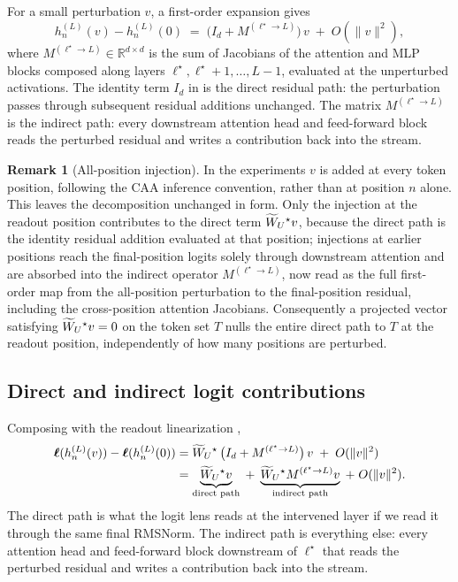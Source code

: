 \documentclass[11pt,letterpaper]{article}
\theoremstyle{plain}
\theoremstyle{definition}
\newtheorem{remark}[theorem]{Remark}
\newcommand{\R}{\mathbb{R}}
\newcommand{\1}{\mathbf{1}}
\newcommand{\WUt}{\widetilde{W}_{U}\mathchoice{}{}{}{}}
\newcommand{\hres}{h}
\begin{document}
For a small perturbation $v$, a first-order expansion gives
\begin{equation}
\hres^{(L)}_n(v) - \hres^{(L)}_n(0) \;=\; \big(I_d + M^{(\ell^\star \to L)}\big)\, v \;+\; O(\|v\|^2),
\label{eq:propagation}
\end{equation}
where $M^{(\ell^\star \to L)} \in \R^{d \times d}$ is the sum of Jacobians of the attention and MLP blocks composed along layers $\ell^\star, \ell^\star+1, \dots, L-1$, evaluated at the unperturbed activations. The identity term $I_d$ in  is the direct residual path: the perturbation passes through subsequent residual additions unchanged. The matrix $M^{(\ell^\star \to L)}$ is the indirect path: every downstream attention head and feed-forward block reads the perturbed residual and writes a contribution back into the stream.

\begin{remark}[All-position injection]
In the experiments $v$ is added at every token position, following the CAA inference convention, rather than at position $n$ alone. This leaves the decomposition  unchanged in form. Only the injection at the readout position contributes to the direct term $\WUt^\star v$, because the direct path is the identity residual addition evaluated at that position; injections at earlier positions reach the final-position logits solely through downstream attention and are absorbed into the indirect operator $M^{(\ell^\star \to L)}$, now read as the full first-order map from the all-position perturbation to the final-position residual, including the cross-position attention Jacobians. Consequently a projected vector satisfying $\WUt^\star v = 0$ on the token set $T$ nulls the entire direct path to $T$ at the readout position, independently of how many positions are perturbed.
\end{remark}

\subsection{Direct and indirect logit contributions}

Composing  with the readout linearization ,
\begin{align}
\bm{\ell}(\hres^{(L)}_n(v)) - \bm{\ell}(\hres^{(L)}_n(0))
&= \WUt^\star\,\big(I_d + M^{(\ell^\star \to L)}\big)\, v \;+\; O(\|v\|^2) \nonumber\\
&= \underbrace{\WUt^\star v}_{\text{direct path}} \;+\; \underbrace{\WUt^\star M^{(\ell^\star \to L)} v}_{\text{indirect path}} \;+\; O(\|v\|^2).
\label{eq:directindirect}
\end{align}
The direct path is what the logit lens \cite{nostalgebraist2020logitlens} reads at the intervened layer if we read it through the same final RMSNorm. The indirect path is everything else: every attention head and feed-forward block downstream of $\ell^\star$ that reads the perturbed residual and writes a contribution back into the stream.
\end{document}
